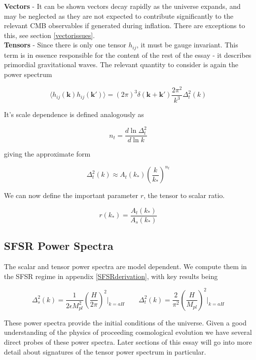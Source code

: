 \documentclass[a4paper,10pt]{article}
\renewcommand{\v}[1]{\mathbf{#1}}
\newcommand{\Mp}{M_{pl}}
\begin{document}
\textbf{Vectors} - It can be shown vectors decay rapidly as the universe expands, and may be neglected as they are not expected to contribute significantly to the relevant CMB observables if generated during inflation. There are exceptions to this, see section \ref{vectorissues}.\\

\textbf{Tensors} - Since there is only one tensor $h_{ij}$, it must be gauge invariant. This term is in essence responsible for the content of the rest of the essay - it describes primordial gravitational waves. The relevant quantity to consider is again the power spectrum

\begin{equation}
\langle h_{ij}(\v{k})h_{ij}(\v{k'}) \rangle=(2\pi)^3\delta(\v{k}+\v{k'})\frac{2\pi^2}{k^3}\Delta^2_t(k)
\label{tensorpowerspec}
\end{equation}

It's scale dependence is defined analogously as 

\begin{equation}
n_t = \frac{d\ln{\Delta^2_t}}{d\ln{k}}
\end{equation}

giving the approximate form 

\begin{equation}
\Delta^2_t(k) \approx A_t(k_*)(\frac{k}{k_*})^{n_t}
\end{equation}

We can now define the important parameter $r$, the tensor to scalar ratio.

\begin{equation}
r(k_*)=\frac{A_t(k_*)}{A_s(k_*)} 
\end{equation}

\subsection{SFSR Power Spectra}

The scalar and tensor power spectra are model dependent. We compute them in the SFSR regime in appendix \ref{SFSRderivation}, with key results being

\begin{equation}
\Delta^2_{s}(k) = \frac{1}{2\epsilon\Mp^2}\left(\frac{H}{2\pi}\right)^2\rvert_{k=aH} \qquad
\Delta^2_t(k)= \frac{2}{\pi^2}\left(\frac{H}{\Mp}\right)^2\rvert_{k=aH}
\end{equation}

These power spectra provide the initial conditions of the universe. Given a good understanding of the physics of proceeding cosmological evolution we have several direct probes of these power spectra. Later sections of this essay will go into more detail about signatures of the tensor power spectrum in particular.\\
\end{document}
